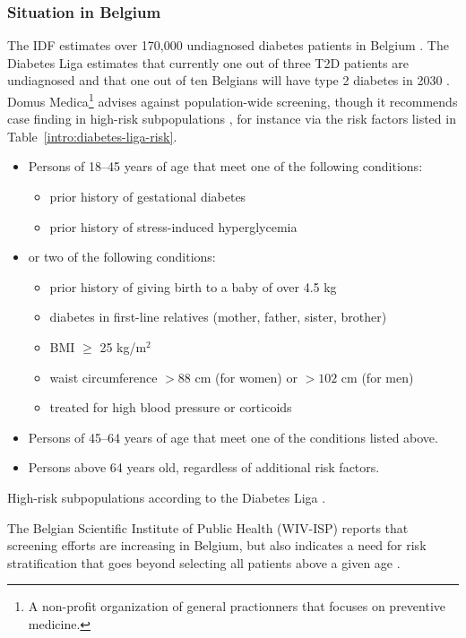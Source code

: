 \subsubsection{Situation in Belgium} \label{intro:screening-belgium}
The IDF estimates over 170,000 undiagnosed diabetes patients in Belgium \citep{IDFatlas}. The Diabetes Liga estimates that currently one out of three T2D patients are undiagnosed and that one out of ten Belgians will have type 2 diabetes in 2030 \citep{diabetesliga}. Domus Medica\footnote{A non-profit organization of general practionners that focuses on preventive medicine.} advises against population-wide screening, though it recommends case finding in high-risk subpopulations \citep{wens2005aanbeveling}, for instance via the risk factors listed in Table~\ref{intro:diabetes-liga-risk}.
\begin{table}[!h]
\colorbox{gray!20!white}{\parbox{\textwidth}{
\begin{itemize}
\item Persons of 18--45 years of age that meet one of the following conditions:
\begin{itemize}
\item prior history of gestational diabetes
\item prior history of stress-induced hyperglycemia
\end{itemize}
\item or two of the following conditions:
\begin{itemize}
\item prior history of giving birth to a baby of over 4.5 kg
\item diabetes in first-line relatives (mother, father, sister, brother)
\item BMI $\geq$ 25 kg/m$^2$
\item waist circumference $>88$ cm (for women) or $>102$ cm (for men)
\item treated for high blood pressure or corticoids
\end{itemize}
\item Persons of 45--64 years of age that meet one of the conditions listed above.
\item Persons above 64 years old, regardless of additional risk factors.
\end{itemize}
}}
\caption{High-risk subpopulations according to the Diabetes Liga \citep{diabetesliga}.} \label{intro:diabetes-liga-risk}
\end{table}

The Belgian Scientific Institute of Public Health (WIV-ISP) reports that screening efforts are increasing in Belgium, but also indicates a need for risk stratification that goes beyond selecting all patients above a given age \citep{wivisp}.




